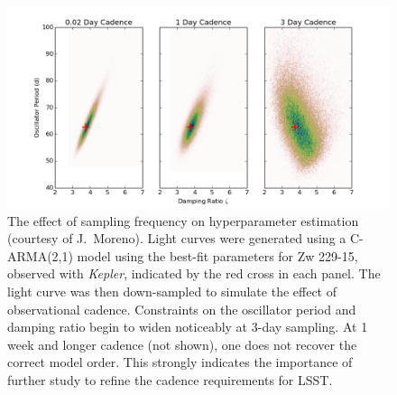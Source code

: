 \begin{figure}
\centering\includegraphics[width=0.9\linewidth]{figs/agn/AGN_Variability_00.png}
\caption{The effect of sampling frequency on hyperparameter estimation (courtesy of
J.~Moreno). Light curves were generated using a C-ARMA(2,1) model using the best-fit
parameters for Zw 229-15, observed with {\em Kepler}, indicated by the red cross in
each panel. The light curve was then down-sampled to simulate the effect of observational
cadence. Constraints on the oscillator period and damping ratio begin to widen noticeably
at 3-day sampling. At 1 week and longer cadence (not shown), one does not recover the
correct model order. This strongly indicates the importance of further study to refine
the cadence requirements for LSST.
}
\label{CadenceEffect}
\end{figure}



